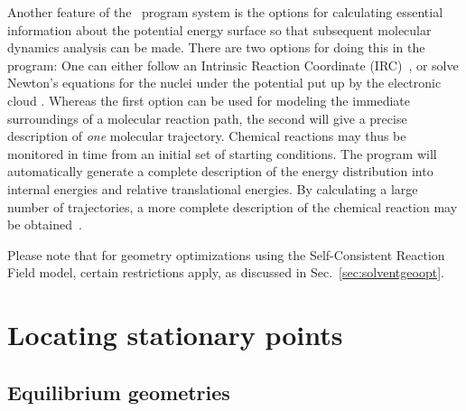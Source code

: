 Another feature of the \dalton\ program system is the options for
calculating essential information about the potential energy
surface so that subsequent molecular dynamics analysis can be
made. There are two options for doing this in the program: One can
either follow an Intrinsic Reaction Coordinate
(IRC)~\cite{pjhjajthtca73}, or solve Newton's equations for the nuclei under the
potential put up by the electronic cloud
\cite{theuhjajcpl173}. Whereas the first option
can be used for modeling the immediate surroundings of a
molecular reaction path, the second will give a precise
description of {\em one} molecular trajectory. Chemical reactions
may thus be monitored in time from an initial set of starting
conditions. The program will automatically generate a complete
description of the energy distribution into internal energies and
relative translational energies. By calculating a large number of
trajectories, a more complete description of the chemical reaction
may be obtained~\cite{rsgmtjdwrjbjcp106}.

Please note that for geometry optimizations using the Self-Consistent
Reaction Field model, certain restrictions apply, as discussed in
Sec.~\ref{sec:solventgeoopt}.

\section{Locating stationary points}

\subsection{Equilibrium geometries}
\label{sec:minimization}

\begin{center}
\end{center}

